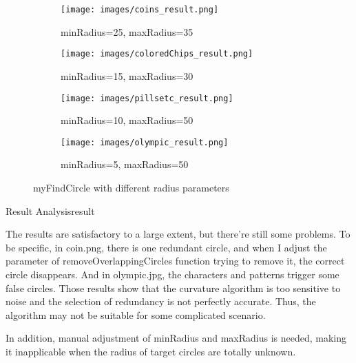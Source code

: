 \begin{figure}[htbp]
    \centering 
    \begin{minipage}{0.8\textwidth} 
        \centering 
        
        \begin{subfigure}[b]{0.45\linewidth} 
            \texttt{[image: images/coins\_result.png]}
            \caption{minRadius=25, maxRadius=35}
        \end{subfigure}
        \hfill
        \begin{subfigure}[b]{0.45\linewidth}
            \texttt{[image: images/coloredChips\_result.png]}
            \caption{minRadius=15, maxRadius=30}
        \end{subfigure}

        \vspace{0.5cm}
        \begin{subfigure}[b]{0.45\linewidth}
            \texttt{[image: images/pillsetc\_result.png]}
            \caption{minRadius=10, maxRadius=50}
        \end{subfigure}
        \hfill
        \begin{subfigure}[b]{0.45\linewidth}
            \texttt{[image: images/olympic\_result.png]}
            \caption{minRadius=5, maxRadius=50}
        \end{subfigure}

        \caption{myFindCircle with different radius parameters}
        \label{fig:Colmar}
    \end{minipage}
\end{figure}



\begin{problem}{Result Analysis}{result}

    The results are satisfactory to a large extent, but there're still some problems. To be specific, in coin.png, there is one redundant circle, and when I adjust the parameter of removeOverlappingCircles function trying to remove it, the correct circle disappears. And in olympic.jpg, the characters and patterns trigger some false circles. Those results show that the curvature algorithm is too sensitive to noise and the selection of redundancy is not perfectly accurate. Thus, the algorithm may not be suitable for some complicated scenario.

    In addition, manual adjustment of minRadius and maxRadius is needed, making it inapplicable when the radius of target circles are totally unknown.

\end{problem}








